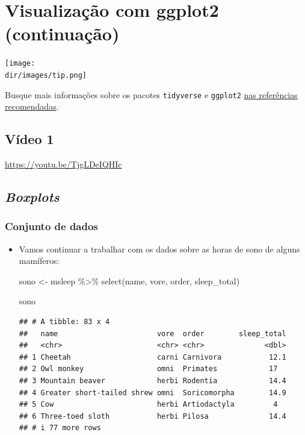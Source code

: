 \documentclass[
  11pt]{report}
\newenvironment{Shaded}{\begin{snugshade}}{\end{snugshade}}
\newcommand{\FunctionTok}[1]{\textcolor[rgb]{0.00,0.00,0.00}{#1}}
\newcommand{\NormalTok}[1]{#1}
\newcommand{\OtherTok}[1]{\textcolor[rgb]{0.56,0.35,0.01}{#1}}
\newcommand{\SpecialCharTok}[1]{\textcolor[rgb]{0.00,0.00,0.00}{#1}}
\newcommand{\dir}{/ssd/R/x86_64-pc-linux-gnu-library/4.3/fnaufelRmd/rmarkdown/resources}
\newenvironment{rmdtip}
{
  \begin{mytip}
    \texttt{[image: \\dir/images/tip.png]}
    \tcblower
  }
  {
  \end{mytip}
}
\renewenvironment{Shaded}{
    \begin{mdframed}[%
      roundcorner=2pt,%
      innerleftmargin=5pt,%
      innerrightmargin=5pt,%
      topline=true,%
      leftline=true,%
      rightline=true,%
      bottomline=true,%
      linewidth=0.5pt,%
      linecolor=black!20,%
      backgroundcolor=black!2,%
      skipabove=2ex,%
      skipbelow=2.5ex%
    ]%
  }
  {
    \end{mdframed}
  }
\begin{document}
\hypertarget{viz2}{%
\chapter{Visualização com ggplot2 (continuação)}\label{viz2}}

\begin{rmdtip}
Busque mais informações sobre os pacotes \texttt{tidyverse} e \texttt{ggplot2} \protect\hyperlink{refrec}{nas referências recomendadas}.

\end{rmdtip}

\hypertarget{vuxeddeo-1-3}{%
\section{Vídeo 1}\label{vuxeddeo-1-3}}

\begin{center} \url{https://youtu.be/TjgLDeIQHIc} \end{center}

\hypertarget{boxplots}{%
\section{\texorpdfstring{\emph{Boxplots}}{Boxplots}}\label{boxplots}}

\hypertarget{conjunto-de-dados}{%
\subsection{Conjunto de dados}\label{conjunto-de-dados}}

\begin{itemize}
\item
  Vamos continuar a trabalhar com os dados sobre as horas de sono de alguns mamíferos:

\begin{Shaded}
\begin{Highlighting}[]
\NormalTok{sono }\OtherTok{\textless{}{-}}\NormalTok{ msleep }\SpecialCharTok{\%\textgreater{}\%} 
  \FunctionTok{select}\NormalTok{(name, vore, order, sleep\_total)}

\NormalTok{sono}
\end{Highlighting}
\end{Shaded}

\begin{verbatim}
## # A tibble: 83 x 4
##   name                       vore  order        sleep_total
##   <chr>                      <chr> <chr>              <dbl>
## 1 Cheetah                    carni Carnivora           12.1
## 2 Owl monkey                 omni  Primates            17  
## 3 Mountain beaver            herbi Rodentia            14.4
## 4 Greater short-tailed shrew omni  Soricomorpha        14.9
## 5 Cow                        herbi Artiodactyla         4  
## 6 Three-toed sloth           herbi Pilosa              14.4
## # i 77 more rows
\end{verbatim}
\end{itemize}
\end{document}
